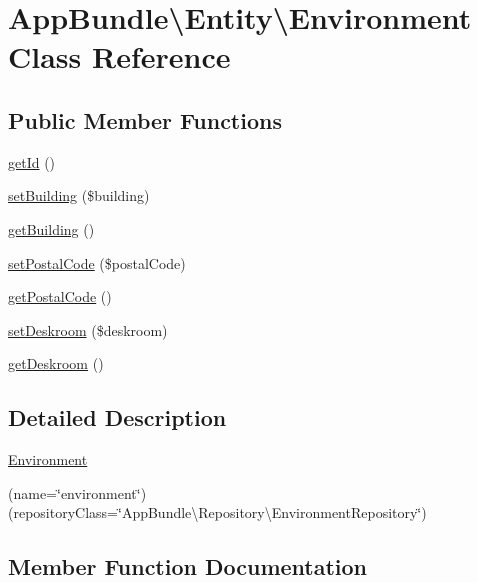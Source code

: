 \hypertarget{class_app_bundle_1_1_entity_1_1_environment}{}\section{App\+Bundle\textbackslash{}Entity\textbackslash{}Environment Class Reference}
\label{class_app_bundle_1_1_entity_1_1_environment}
\subsection*{Public Member Functions}
\begin{DoxyCompactItemize}
\item 
\mbox{\hyperlink{class_app_bundle_1_1_entity_1_1_environment_a64c10b203ad4c23205d9f53ec7f66e63}{get\+Id}} ()
\item 
\mbox{\hyperlink{class_app_bundle_1_1_entity_1_1_environment_a8b571562ffee574942b807c92e7de3b4}{set\+Building}} (\$building)
\item 
\mbox{\hyperlink{class_app_bundle_1_1_entity_1_1_environment_a86fd85af01868fe93f4d35775c265c5c}{get\+Building}} ()
\item 
\mbox{\hyperlink{class_app_bundle_1_1_entity_1_1_environment_a8993cc1bedd743e58c3eed6b23347fe7}{set\+Postal\+Code}} (\$postal\+Code)
\item 
\mbox{\hyperlink{class_app_bundle_1_1_entity_1_1_environment_aaef0918c6dce686a21e50c5a696afe23}{get\+Postal\+Code}} ()
\item 
\mbox{\hyperlink{class_app_bundle_1_1_entity_1_1_environment_a8851f6a5ef9b643eaa5d97d51399e547}{set\+Deskroom}} (\$deskroom)
\item 
\mbox{\hyperlink{class_app_bundle_1_1_entity_1_1_environment_a788745e2b9c4d44ff9c9cb5503e67a30}{get\+Deskroom}} ()
\end{DoxyCompactItemize}


\subsection{Detailed Description}
\mbox{\hyperlink{class_app_bundle_1_1_entity_1_1_environment}{Environment}}

(name=\char`\"{}environment\char`\"{}) (repository\+Class=\char`\"{}\+App\+Bundle\textbackslash{}\+Repository\textbackslash{}\+Environment\+Repository\char`\"{}) 

\subsection{Member Function Documentation}
\mbox{\label{class_app_bundle_1_1_entity_1_1_environment_a86fd85af01868fe93f4d35775c265c5c}} 
